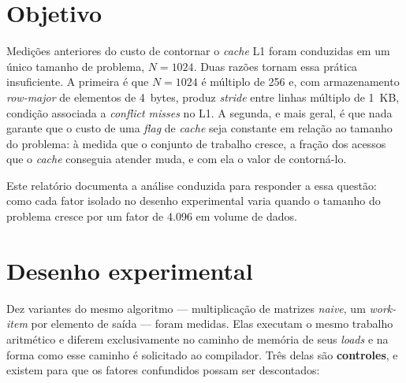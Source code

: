 \documentclass[12pt]{article}
\begin{document}
\section{Objetivo}

Medições anteriores do custo de contornar o \textit{cache} L1 foram conduzidas
em um único tamanho de problema, $N=1024$. Duas razões tornam essa prática
insuficiente. A primeira é que $N=1024$ é múltiplo de 256 e, com armazenamento
\textit{row-major} de elementos de 4~bytes, produz \textit{stride} entre linhas
múltiplo de 1~KB, condição associada a \textit{conflict misses} no L1. A
segunda, e mais geral, é que nada garante que o custo de uma \textit{flag} de
\textit{cache} seja constante em relação ao tamanho do problema: à medida que o
conjunto de trabalho cresce, a fração dos acessos que o \textit{cache} conseguia
atender muda, e com ela o valor de contorná-lo.

Este relatório documenta a análise conduzida para responder a essa questão:
como cada fator isolado no desenho experimental varia quando o tamanho do
problema cresce por um fator de 4.096 em volume de dados.

\section{Desenho experimental}

Dez variantes do mesmo algoritmo --- multiplicação de matrizes \textit{naive},
um \textit{work-item} por elemento de saída --- foram medidas. Elas executam o
mesmo trabalho aritmético e diferem exclusivamente no caminho de memória de seus
\textit{loads} e na forma como esse caminho é solicitado ao compilador. Três
delas são \textbf{controles}, e existem para que os fatores confundidos possam
ser descontados:
\end{document}
